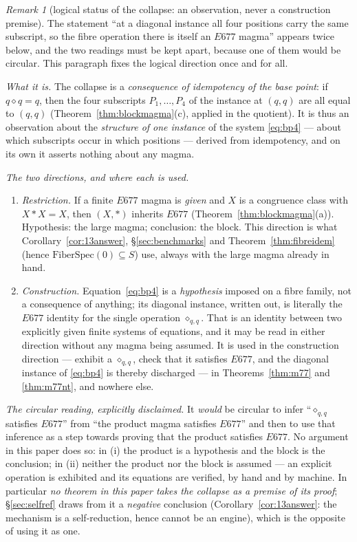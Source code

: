 \documentclass[11pt]{article}
\theoremstyle{plain}
\theoremstyle{definition}
\theoremstyle{remark}
\newtheorem*{remark*}{Remark}
\numberwithin{equation}{section}
\newcommand{\op}{\mathbin{*}}
\begin{document}
\begin{remark*}[logical status of the collapse: an observation, never a construction
premise]\label{rem:collapsestatus}
The statement ``at a diagonal instance all four positions carry the same subscript, so the
fibre operation there is itself an $E677$ magma'' appears twice below, and the two readings
must be kept apart, because one of them would be circular. This paragraph fixes the logical
direction once and for all.

\emph{What it is.} The collapse is a \emph{consequence of idempotency of the base point}: if
$q\diamond q = q$, then the four subscripts $P_1,\dots,P_4$ of the instance at $(q,q)$ are
all equal to $(q,q)$ (Theorem~\ref{thm:blockmagma}(c), applied in the quotient). It is thus
an observation about the \emph{structure of one instance} of the system \eqref{eq:bp4} ---
about which subscripts occur in which positions --- derived from idempotency, and on its own
it asserts nothing about any magma.

\emph{The two directions, and where each is used.}
\begin{enumerate}
\item[(i)] \emph{Restriction.} If a finite $E677$ magma is \emph{given} and $X$ is a
congruence class with $X\op X = X$, then $(X,\op)$ inherits $E677$
(Theorem~\ref{thm:blockmagma}(a)). Hypothesis: the large magma; conclusion: the block. This
direction is what Corollary~\ref{cor:13answer}, \S\ref{sec:benchmarks} and
Theorem~\ref{thm:fibreidem} (hence $\mathrm{FiberSpec}(0)\subseteq S$) use, always with the
large magma already in hand.
\item[(ii)] \emph{Construction.} Equation~\eqref{eq:bp4} is a \emph{hypothesis} imposed on a
fibre family, not a consequence of anything; its diagonal instance, written out, is literally
the $E677$ identity for the single operation $\diamond_{q,q}$. That is an identity between
two explicitly given finite systems of equations, and it may be read in either direction
without any magma being assumed. It is used in the construction direction --- exhibit a
$\diamond_{q,q}$, check that it satisfies $E677$, and the diagonal instance of
\eqref{eq:bp4} is thereby discharged --- in Theorems~\ref{thm:m77} and \ref{thm:m77nt}, and
nowhere else.
\end{enumerate}

\emph{The circular reading, explicitly disclaimed.} It \emph{would} be circular to infer
``$\diamond_{q,q}$ satisfies $E677$'' from ``the product magma satisfies $E677$'' and then to
use that inference as a step towards proving that the product satisfies $E677$. No argument
in this paper does so: in (i) the product is a hypothesis and the block is the conclusion; in
(ii) neither the product nor the block is assumed --- an explicit operation is exhibited and
its equations are verified, by hand and by machine. In particular \emph{no theorem in this
paper takes the collapse as a premise of its proof}; \S\ref{sec:selfref} draws from it a
\emph{negative} conclusion (Corollary~\ref{cor:13answer}: the mechanism is a self-reduction,
hence cannot be an engine), which is the opposite of using it as one.


\end{remark*}
\end{document}
